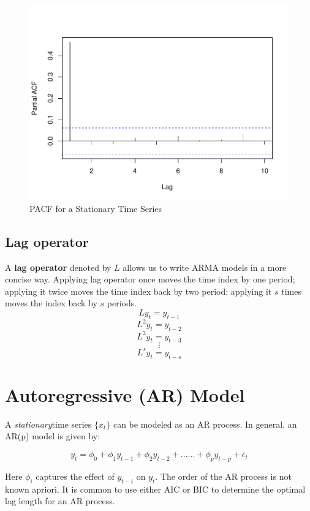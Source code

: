 \documentclass[]{book}
\theoremstyle{definition}
\theoremstyle{definition}
\theoremstyle{definition}
\theoremstyle{remark}
\begin{document}
\begin{figure}

{\centering \includegraphics[width=0.8\linewidth]{bookdown-demo_files/figure-latex/ch6-figure4-1} 

}

\caption{PACF for a Stationary Time Series}\label{fig:ch6-figure4}
\end{figure}

\hypertarget{lag-operator}{%
\subsection{Lag operator}\label{lag-operator}}

A \textbf{lag operator} denoted by \(L\) allows us to write ARMA models
in a more concise way. Applying lag operator once moves the time index
by one period; applying it twice moves the time index back by two
period; applying it \(s\) times moves the index back by \(s\) periods.
\[ Ly_t=y_{t-1} \] \[ L^2y_t=y_{t-2} \] \[ L^3y_t=y_{t-3} \] \[\vdots\]
\[ L^sy_t=y_{t-s} \]

\hypertarget{autoregressive-ar-model}{%
\section{Autoregressive (AR) Model}\label{autoregressive-ar-model}}

A \emph{stationary}time series \(\{x_t\}\) can be modeled as an AR
process. In general, an AR(p) model is given by:

\begin{equation}
 y_t = \phi_0 +\phi_1 y_{t-1} + \phi_2 y_{t-2} + ...... + \phi_p y_{t-p}+\epsilon_t
 \end{equation}

Here \(\phi_i\) captures the effect of \(y_{t-i}\) on \(y_t\). The order
of the AR process is not known apriori. It is common to use either AIC
or BIC to determine the optimal lag length for an AR process.
\end{document}
